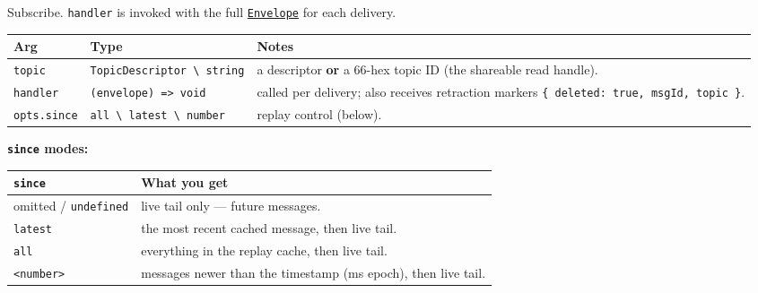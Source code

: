 \documentclass[
  nobib]{tufte-handout}
\newcounter{none} %
\begin{document}
Subscribe. \texttt{handler} is invoked with the full
\hyperref[envelope-type]{\texttt{Envelope}} for each delivery.

{\def\LTcaptype{none} %
\begin{longtable}[]{@{}
  >{\raggedright\arraybackslash}p{}
  >{\raggedright\arraybackslash}p{}
  >{\raggedright\arraybackslash}p{}@{}}
\toprule\noalign{}
\begin{minipage}[b]{\linewidth}\raggedright
Arg
\end{minipage} & \begin{minipage}[b]{\linewidth}\raggedright
Type
\end{minipage} & \begin{minipage}[b]{\linewidth}\raggedright
Notes
\end{minipage} \\
\midrule\noalign{}
\endhead
\bottomrule\noalign{}
\endlastfoot
\texttt{topic} &
\texttt{TopicDescriptor\ \textbackslash{}\textbar{}\ string} & a
descriptor \textbf{or} a 66-hex topic ID (the shareable read handle). \\
\texttt{handler} & \texttt{(envelope)\ =\textgreater{}\ void} & called
per delivery; also receives retraction markers
\texttt{\{\ deleted:\ true,\ msgId,\ topic\ \}}. \\
\texttt{opts.since} &
\texttt{\textquotesingle{}all\textquotesingle{}\ \textbackslash{}\textbar{}\ \textquotesingle{}latest\textquotesingle{}\ \textbackslash{}\textbar{}\ number}
& replay control (below). \\
\end{longtable}
}

\textbf{\texttt{since} modes:}

{\def\LTcaptype{none} %
\begin{longtable}[]{@{}
  >{\raggedright\arraybackslash}p{}
  >{\raggedright\arraybackslash}p{}@{}}
\toprule\noalign{}
\begin{minipage}[b]{\linewidth}\raggedright
\texttt{since}
\end{minipage} & \begin{minipage}[b]{\linewidth}\raggedright
What you get
\end{minipage} \\
\midrule\noalign{}
\endhead
\bottomrule\noalign{}
\endlastfoot
omitted / \texttt{undefined} & live tail only --- future messages. \\
\texttt{\textquotesingle{}latest\textquotesingle{}} & the most recent
cached message, then live tail. \\
\texttt{\textquotesingle{}all\textquotesingle{}} & everything in the
replay cache, then live tail. \\
\texttt{\textless{}number\textgreater{}} & messages newer than the
timestamp (ms epoch), then live tail. \\
\end{longtable}
}
\end{document}
